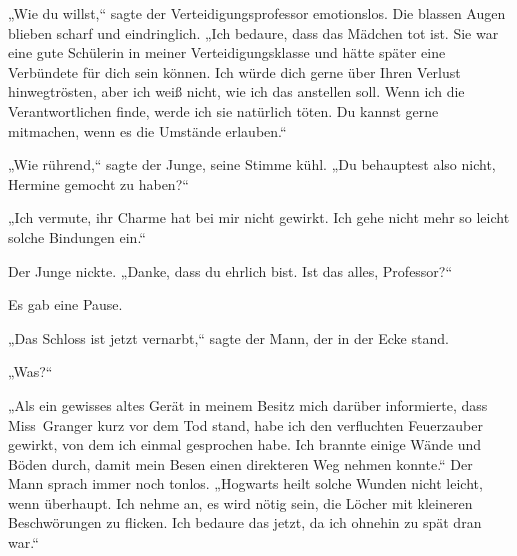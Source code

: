 „Wie du willst,“ sagte der Verteidigungsprofessor emotionslos.
Die blassen Augen blieben scharf und eindringlich.
„Ich bedaure, dass das Mädchen tot ist. Sie war eine gute Schülerin in meiner Verteidigungsklasse und hätte später eine Verbündete für dich sein können. Ich würde dich gerne über Ihren Verlust hinwegtrösten, aber ich weiß nicht, wie ich das anstellen soll. Wenn ich die Verantwortlichen finde, werde ich sie natürlich töten. Du kannst gerne mitmachen, wenn es die Umstände erlauben.“

„Wie rührend,“ sagte der Junge, seine Stimme kühl.
„Du behauptest also nicht, Hermine gemocht zu haben?“

„Ich vermute, ihr Charme hat bei mir nicht gewirkt. Ich gehe nicht mehr so leicht solche Bindungen ein.“

Der Junge nickte.
„Danke, dass du ehrlich bist. Ist das alles, Professor?“

Es gab eine Pause.

„Das Schloss ist jetzt vernarbt,“ sagte der Mann, der in der Ecke stand.

„Was?“

„Als ein gewisses altes Gerät in meinem Besitz mich darüber informierte, dass Miss~Granger kurz vor dem Tod stand, habe ich den verfluchten Feuerzauber gewirkt, von dem ich einmal gesprochen habe. Ich brannte einige Wände und Böden durch, damit mein Besen einen direkteren Weg nehmen konnte.“
Der Mann sprach immer noch tonlos.
„Hogwarts heilt solche Wunden nicht leicht, wenn überhaupt. Ich nehme an, es wird nötig sein, die Löcher mit kleineren Beschwörungen zu flicken. Ich bedaure das jetzt, da ich ohnehin zu spät dran war.“

